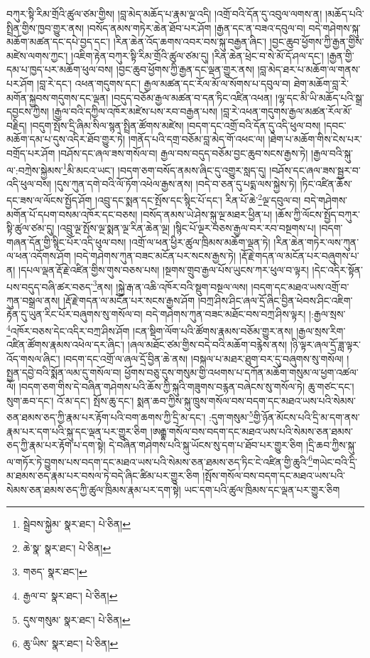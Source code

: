 བཀུར་སྟི་རིམ་གྲོའི་ཚུལ་ཙམ་གྱིས། །བླ་མེད་མཆོད་པ་རྣམ་ལྔ་འདི། །འགྲོ་བའི་དོན་དུ་འབུལ་ལགས་ན། །མཆོད་པའི་སྤྲིན་གྱིས་ཁྱབ་གྱུར་ནས། །བསོད་ནམས་གཏེར་ཆེན་ཐོབ་པར་ཤོག །རྒྱན་དང་ན་བཟའ་དབུལ་བ། བདེ་གཤེགས་སྐུ་མཆོག་མཚན་དང་དཔེ་བྱད་དང་། །རིན་ཆེན་འོད་ཆགས་འབར་བས་སྐུ་བརྒྱན་ཞིང་། །བྱང་ཆུབ་ཕྱོགས་ཀྱི་རྒྱན་གྱིས་མཛེས་ལགས་ཀྱང་། །འཇིག་རྟེན་བཀུར་སྟི་རིམ་གྲོའི་ཚུལ་ཙམ་དུ། །རིན་ཆེན་ཕྲེང་བ་སེ་མོ་དོ་ཤལ་དང་། །རྒྱན་གྱི་དམ་པ་ཁྱད་པར་མཆོག་ཕུལ་བས། །བྱང་ཆུབ་ཕྱོགས་ཀྱི་རྒྱན་དང་ལྡན་གྱུར་ནས། །བླ་མེད་ཐར་པ་མཆོག་ལ་གནས་པར་ཤོག །བླ་རེ་དང་། འཕན་གདུགས་དང་། རྒྱལ་མཚན་དང་རོལ་མོ་ལ་སོགས་པ་དབུལ་བ། ཐེག་མཆོག་བླ་རེ་མགོན་སྐྱབས་གདུགས་དང་ལྡན། །བདུད་བཅོམ་རྒྱལ་མཚན་བ་དན་ཏིང་འཛིན་འཕན། །ལྷ་དང་མི་ཡི་མཆོད་པའི་སྒྲ་དབྱངས་ཀྱིས། །རྒྱལ་བའི་དཀྱིལ་འཁོར་མཛེས་པས་རབ་བརྒྱན་པས། །བླ་རེ་འཕན་གདུགས་རྒྱལ་མཚན་རོལ་མོ་བརྗིད། །བདུག་སྤོས་དྲི་ཞིམ་སིལ་སྙན་སྤྲིན་ཚོགས་མཛེས། །བདག་དང་འགྲོ་བའི་དོན་དུ་འདི་ཕུལ་བས། །དབང་མཆོག་དམ་པ་དུས་འདིར་ཐོབ་གྱུར་ཏེ། །གནོད་པའི་དགྲ་བཅོམ་བླ་མེད་གོ་འཕང་ལ། །ཐེག་པ་མཆོག་གིས་ངེས་པར་བགྲོད་པར་ཤོག །བཤོས་དང་ཞལ་ཟས་གསོལ་བ། རྒྱལ་བས་བདུད་བཅོམ་བྱང་ཆུབ་སངས་རྒྱས་ཏེ། །རྒྱལ་བའི་སྐུ་ལ་:བཀྲེས་སྐྱེམས་\footnote{སྦྲེབས་སྐྱེམ་  སྣར་ཐང་།  པེ་ཅིན། }མི་མངའ་ཡང་། །བདག་ཅག་བསོད་ནམས་ཞིང་དུ་འགྱུར་སླད་དུ། །བཤོས་དང་ཞལ་ཟས་སྦྱར་བ་འདི་ཕུལ་བས། །དུས་ཀུན་དགེ་བའི་ལོ་ཏོག་འཕེལ་རྒྱས་ནས། །བདེ་བ་ཅན་དུ་པདྨ་ལས་སྐྱེས་ཏེ། །ཏིང་འཛིན་ཆོས་དང་ཟས་ལ་ལོངས་སྤྱོད་ཤོག །འབྲུ་དང་སྨན་དང་སྤོས་དང་སྙིང་པོ་དང་། རིན་པོ་ཆེ་\footnote{ཆེ་སྣ་  སྣར་ཐང་།  པེ་ཅིན། }ལྔ་དབུལ་བ། བདེ་གཤེགས་མགོན་པོ་དཔག་བསམ་འཁོར་དང་བཅས། །བསོད་ནམས་ཡེ་ཤེས་སྐུ་ལྔ་མཐར་ཕྱིན་པ། །ཆོས་ཀྱི་ལོངས་སྤྱོད་བཀུར་སྟི་ཚུལ་ཙམ་དུ། །འབྲུ་ལྔ་སྤོས་ལྔ་སྨན་ལྔ་རིན་ཆེན་ལྔ། །སྙིང་པོ་ལྔར་བཅས་རྒྱལ་བར་རབ་བསྔགས་པ། །བདག་གཞན་དོན་གྱི་སྙིང་པོར་འདི་ཕུལ་བས། །འགྲོ་ལ་ཕན་ཕྱིར་ཚུལ་ཁྲིམས་མཆོག་ལྡན་ཏེ། །རིན་ཆེན་གཏེར་ལས་ཀུན་ལ་ཕན་འདོགས་ཤོག །བདེ་གཤེགས་ཀུན་བཟང་མངོན་པར་སངས་རྒྱས་ཏེ། །རྡོ་རྗེ་གདན་ལ་མངོན་པར་བཞུགས་པ་ན། །དཔལ་ལྡན་རྡོ་རྗེ་འཛིན་གྱིས་གུས་བཅས་པས། །སྔགས་གྲུབ་རྒྱལ་པོས་ཡུངས་ཀར་ཕུལ་བ་ལྟར། །དེང་འདིར་སྟོན་པས་བདུད་བཞི་ཚར་བཅད་\footnote{གཅད་  སྣར་ཐང་། }ནས། །སྐྱེ་རྒ་ན་འཆི་འཁོར་བའི་སྡུག་བསྔལ་ལས། །བདག་དང་མཐའ་ཡས་འགྲོ་བ་ཀུན་བསྒྲལ་ནས། །རྡོ་རྗེ་གདན་ལ་མངོན་པར་སངས་རྒྱས་ཤོག །བཀྲ་ཤིས་ཤིང་ཞལ་དྲོ་ཞིང་བྱིན་ཕེབས་ཤིང་འཇིག་རྟེན་དུ་ཡུན་རིང་པོར་བཞུགས་སུ་གསོལ་བ། བདེ་གཤེགས་ཀུན་བཟང་མཐོང་བས་བཀྲ་ཤིས་ལྟར། །:རྒྱལ་སྲས་\footnote{རྒྱལ་བ་  སྣར་ཐང་།  པེ་ཅིན། }འཁོར་བཅས་དེང་འདིར་བཀྲ་ཤིས་ཤོག །ངན་སྡིག་ལོག་པའི་ཚོགས་རྣམས་བཅོམ་གྱུར་ནས། །རྒྱལ་སྲས་རིག་འཛིན་ཚོགས་རྣམས་འཕེལ་དར་ཞིང་། །ཞལ་མཐོང་ཙམ་གྱིས་བདེ་བའི་མཆོག་བརྙེས་ནས། །ཉི་ལྟར་ཞལ་དྲོ་ཟླ་ལྟར་འོད་གསལ་ཞིང་། །བདག་དང་འགྲོ་ལ་ཞལ་དྲོ་བྱིན་ཆེ་ནས། །བསྐལ་པ་མཐར་ཐུག་བར་དུ་བཞུགས་སུ་གསོལ། །སྤྱན་དབྱེ་བའི་སྨོན་ལམ་དུ་གསོལ་བ། ཕྱོགས་བཅུ་དུས་གསུམ་གྱི་འཕགས་པ་དཀོན་མཆོག་གསུམ་ལ་ཕྱག་འཚལ་ལོ། །བདག་ཅག་གིས་དེ་བཞིན་གཤེགས་པའི་ཆོས་ཀྱི་སྐུའི་གཟུགས་བརྙན་བཞེངས་སུ་གསོལ་ཏེ། ཆུ་གཙང་དང་། སུག་ཆབ་དང་། འོ་མ་དང་། སྤོས་ཆུ་དང་། སྨན་ཆབ་ཀྱིས་སྐུ་ཁྲུས་གསོལ་བས་བདག་དང་མཐའ་ཡས་པའི་སེམས་ཅན་ཐམས་ཅད་ཀྱི་རྣམ་པར་རྟོག་པའི་བག་ཆགས་ཀྱི་དྲི་མ་དང་། :དུག་གསུམ་\footnote{དུས་གསུམ་  སྣར་ཐང་།  པེ་ཅིན། }གྱི་ཉོན་མོངས་པའི་དྲི་མ་དག་ནས་རྣམ་པར་དག་པའི་སྐུ་དང་ལྡན་པར་གྱུར་ཅིག །ཨརྒྷ་གསོལ་བས་བདག་དང་མཐའ་ཡས་པའི་སེམས་ཅན་ཐམས་ཅད་ཀྱི་རྣམ་པར་རྟོག་པ་དག་སྟེ། དེ་བཞིན་གཤེགས་པའི་སྐུ་ཡོངས་སུ་དག་པ་ཐོབ་པར་གྱུར་ཅིག །དྲི་ཆབ་ཀྱིས་སྐུ་ལ་གཏོར་ཏེ་བྱུགས་པས་བདག་དང་མཐའ་ཡས་པའི་སེམས་ཅན་ཐམས་ཅད་ཏིང་ངེ་འཛིན་གྱི་ཆུའི་\footnote{ཆུ་ཡིས་  སྣར་ཐང་།  པེ་ཅིན། }གཡེང་བའི་དྲི་མ་ཐམས་ཅད་རྣམ་པར་བསལ་ཏེ་བདེ་ཞིང་ཚིམ་པར་གྱུར་ཅིག །སྤོས་གསོལ་བས་བདག་དང་མཐའ་ཡས་པའི་སེམས་ཅན་ཐམས་ཅད་ཀྱི་ཚུལ་ཁྲིམས་རྣམ་པར་དག་སྟེ། ཡང་དག་པའི་ཚུལ་ཁྲིམས་དང་ལྡན་པར་གྱུར་ཅིག 